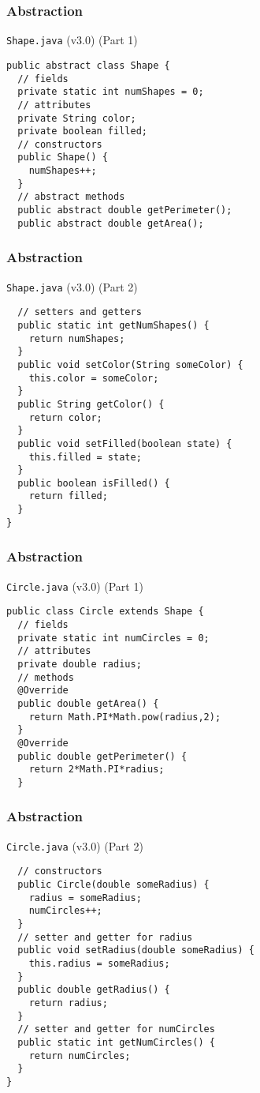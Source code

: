 \documentclass[10pt, compress]{beamer}
\begin{document}
\begin{frame}[fragile]
  \frametitle{Abstraction}
  \begin{block}{\texttt{Shape.java} (v3.0) (Part 1)}
    \begin{verbatim}
public abstract class Shape {
  // fields
  private static int numShapes = 0;
  // attributes
  private String color;
  private boolean filled;
  // constructors
  public Shape() {
    numShapes++;
  }
  // abstract methods
  public abstract double getPerimeter();
  public abstract double getArea();
    \end{verbatim}
  \end{block}
\end{frame}

\begin{frame}[fragile]
  \frametitle{Abstraction}
  \begin{block}{\texttt{Shape.java} (v3.0) (Part 2)}
    \begin{verbatim}
  // setters and getters
  public static int getNumShapes() {
    return numShapes;
  }
  public void setColor(String someColor) {
    this.color = someColor;
  }
  public String getColor() {
    return color;
  }
  public void setFilled(boolean state) {
    this.filled = state;
  }
  public boolean isFilled() {
    return filled;
  }
}
    \end{verbatim}
  \end{block}
\end{frame}

\begin{frame}[fragile]
  \frametitle{Abstraction}
  \begin{block}{\texttt{Circle.java} (v3.0) (Part 1)}
    \begin{verbatim}
public class Circle extends Shape {
  // fields
  private static int numCircles = 0;
  // attributes
  private double radius;
  // methods
  @Override
  public double getArea() {
    return Math.PI*Math.pow(radius,2);
  }
  @Override
  public double getPerimeter() {
    return 2*Math.PI*radius;
  }
    \end{verbatim}
  \end{block}
\end{frame}

\begin{frame}[fragile]
  \frametitle{Abstraction}
  \begin{block}{\texttt{Circle.java} (v3.0) (Part 2)}
    \begin{verbatim}
  // constructors
  public Circle(double someRadius) {
    radius = someRadius;
    numCircles++;
  }
  // setter and getter for radius
  public void setRadius(double someRadius) {
    this.radius = someRadius;
  }
  public double getRadius() {
    return radius;
  }
  // setter and getter for numCircles
  public static int getNumCircles() {
    return numCircles;
  }
}
    \end{verbatim}
  \end{block}
\end{frame}
\end{document}
